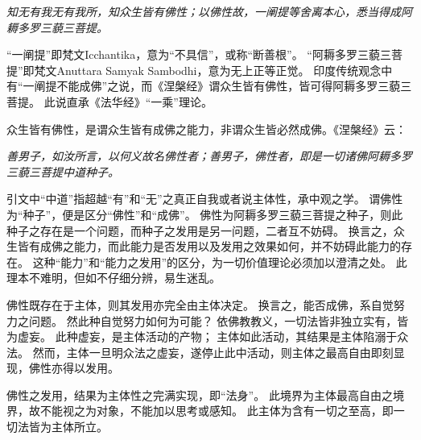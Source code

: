 \documentclass[11pt]{article}
\begin{document}
\textit{知无有我无有我所，知众生皆有佛性；以佛性故，一阐提等舍离本心，悉当得成阿耨多罗三藐三菩提。}

“一阐提”即梵文Icchantika，意为“不具信”，或称“断善根”。
“阿耨多罗三藐三菩提”即梵文Anuttara Samyak Sambodhi，意为无上正等正觉。
印度传统观念中有“一阐提不能成佛”之说，而《涅槃经》谓众生皆有佛性，皆可得阿耨多罗三藐三菩提。
此说直承《法华经》“一乘”理论。

\newline

众生皆有佛性，是谓众生皆有成佛之能力，非谓众生皆必然成佛。《涅槃经》云：

\textit{善男子，如汝所言，以何义故名佛性者；善男子，佛性者，即是一切诸佛阿耨多罗三藐三菩提中道种子。}

引文中“中道”指超越“有”和“无”之真正自我或者说主体性，承中观之学。
谓佛性为“种子”，便是区分“佛性”和“成佛”。
佛性为阿耨多罗三藐三菩提之种子，则此种子之存在是一个问题，而种子之发用是另一问题，二者互不妨碍。
换言之，众生皆有成佛之能力，而此能力是否发用以及发用之效果如何，并不妨碍此能力的存在。
这种“能力”和“能力之发用”的区分，为一切价值理论必须加以澄清之处。
此理本不难明，但如不仔细分辨，易生迷乱。

\newline

佛性既存在于主体，则其发用亦完全由主体决定。
换言之，能否成佛，系自觉努力之问题。
然此种自觉努力如何为可能？
依佛教教义，一切法皆非独立实有，皆为虚妄。
此种虚妄，是主体活动的产物；
主体如此活动，其结果是主体陷溺于众法。
然而，主体一旦明众法之虚妄，遂停止此中活动，则主体之最高自由即刻显现，佛性亦得以发用。

\newline

佛性之发用，结果为主体性之完满实现，即“法身”。
此境界为主体最高自由之境界，故不能视之为对象，不能加以思考或感知。
此主体为含有一切之至高，即一切法皆为主体所立。
  
\end{document}
